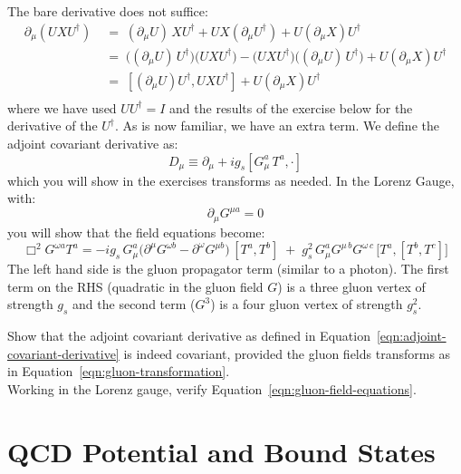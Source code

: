 \documentclass[12pt]{article}
\begin{document}
The bare derivative does not suffice:
\begin{align*}
  \partial_\mu (U X U^\dagger)
  \;&=\; (\partial_\mu U)\, X U^\dagger
  + U X (\partial_\mu U^\dagger)
  + U (\partial_\mu X) U^\dagger\\
  \;&=\; \big((\partial_\mu U)\, U^\dagger\big)  \big(U X U^\dagger\big)
  - \big(U X U^\dagger\big) \big((\partial_\mu U)\, U^\dagger\big)  
  + U (\partial_\mu X) U^\dagger\\
  \;&=\; [(\partial_\mu U) U^\dagger, U X U^\dagger] + U (\partial_\mu X) U^\dagger\\
\end{align*}
where we have used $U U^\dagger = I$ and the results of the exercise
below for the derivative of the $U^\dagger$.  As is now familiar, we
have an extra term.  We define the adjoint covariant derivative as:
\begin{equation}
  \label{eqn:adjoint-covariant-derivative}
  D_\mu \equiv \partial_\mu + i g_s [G_\mu^a \, T^a, \cdot]
\end{equation}
which you will show in the exercises transforms as needed.
In the Lorenz Gauge, with:
$$\partial_\mu G^{\mu a} = 0$$
you will show that the field equations become:
\begin{equation}
  \label{eqn:gluon-field-equations}
  \Box^2 G^{\omega a} T^a =
  - i g_s\, G^a_\mu \big(\partial^\mu G^{\omega b} - \partial^\omega G^{\mu b}\big)
      \, [T^a, T^b]
  \;+\; g_s^2\, G^a_\mu G^{\mu\,b} G^{\omega\,c}\,
      \big[T^a, [T^b, T^c]\big]
\end{equation}
The left hand side is the gluon propagator term (similar to a photon).
The first term on the RHS (quadratic in the gluon field $G$) is a
three gluon vertex of strength $g_s$ and the second term ($G^3$) is a
four gluon vertex of strength $g_s^2$.

\exercise Show that the adjoint covariant derivative as defined in
Equation~\ref{eqn:adjoint-covariant-derivative} is indeed
covariant, provided the gluon fields transforms as in Equation~\ref{eqn:gluon-transformation}.\\[5pt]

\exercise Working in the Lorenz gauge, verify Equation~\ref{eqn:gluon-field-equations}.\\[5pt]

\section{QCD Potential and Bound States}
\end{document}
